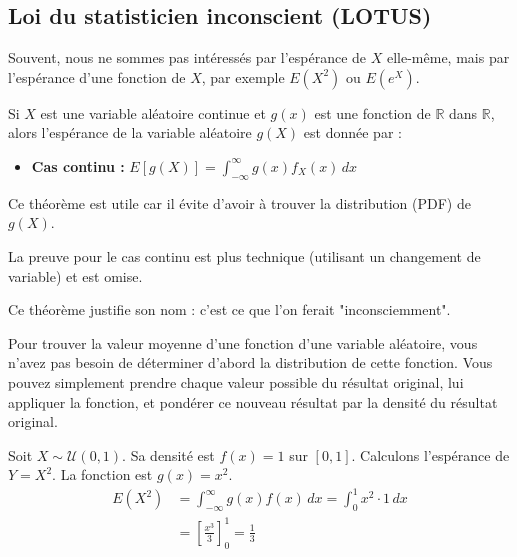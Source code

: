 \subsection{Loi du statisticien inconscient (LOTUS)}

Souvent, nous ne sommes pas intéressés par l'espérance de $X$ elle-même, mais par l'espérance d'une fonction de $X$, par exemple $E(X^2)$ ou $E(e^X)$.

\begin{theorembox}
Si $X$ est une variable aléatoire continue et $g(x)$ est une fonction de $\mathbb{R}$ dans $\mathbb{R}$, alors l'espérance de la variable aléatoire $g(X)$ est donnée par :
\begin{itemize}
    \item \textbf{Cas continu :} $E[g(X)] = \int_{-\infty}^{\infty} g(x) f_X(x) \, dx$
\end{itemize}
Ce théorème est utile car il évite d'avoir à trouver la distribution (PDF) de $g(X)$.
\end{theorembox}

\begin{proofbox}
La preuve pour le cas continu est plus technique (utilisant un changement de variable) et est omise.
\end{proofbox}

Ce théorème justifie son nom : c'est ce que l'on ferait "inconsciemment".

\begin{intuitionbox}
Pour trouver la valeur moyenne d'une fonction d'une variable aléatoire, vous n'avez pas besoin de déterminer d'abord la distribution de cette fonction. Vous pouvez simplement prendre chaque valeur possible du résultat original, lui appliquer la fonction, et pondérer ce nouveau résultat par la densité du résultat original.
\end{intuitionbox}

\begin{examplebox}
Soit $X \sim \mathcal{U}(0, 1)$. Sa densité est $f(x)=1$ sur $[0, 1]$. Calculons l'espérance de $Y=X^2$. La fonction est $g(x)=x^2$.
\begin{align*}
E(X^2) &= \int_{-\infty}^{\infty} g(x) f(x) \, dx = \int_{0}^{1} x^2 \cdot 1 \, dx \\
&= \left[ \frac{x^3}{3} \right]_0^1 = \frac{1}{3}
\end{align*}
\end{examplebox}

